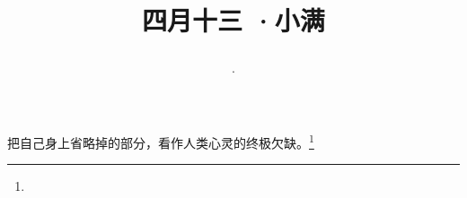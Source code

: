 \title{\date[d=20,m=5,y=2024][year:cn-y,年,month:cn,day:cn,日,·,weekday]·四月十三 ·小满}
把自己身上省略掉的部分，看作人类心灵的终极欠缺。\footnote{ }

